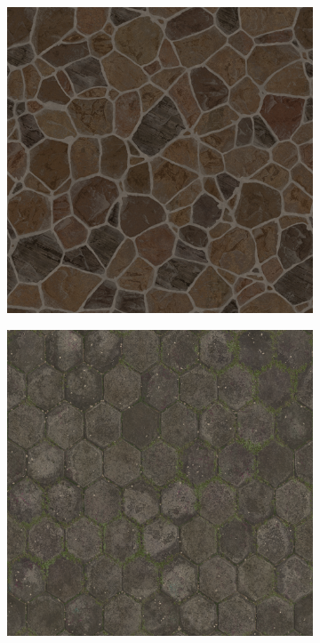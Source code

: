 \begin{figure}
    \centering
    \begin{subfigure}{.3\textwidth}
        \centering
        \includegraphics[width=\textwidth]{contenu/resources/images/texture_1}
    \end{subfigure}
    \hfill
    \begin{subfigure}{.3\textwidth}
        \centering
        \includegraphics[width=\textwidth]{contenu/resources/images/texture_2}

\end{subfigure}
\end{figure}

